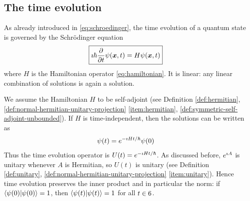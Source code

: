 \begin{digression}
\end{digression}


\subsection{The time evolution}\label{sec:time-evolution}

As already introduced in \eqref{eq:schroedinger}, the time evolution of a quantum state is governed by the Schrödinger equation
\[
\boxed{
\imath \hbar  \frac{\partial}{\partial t}\psi({\boldsymbol{x}}, t) = H  \psi({\boldsymbol{x}}, t)
}
\]
where $H$ is the Hamiltonian operator \eqref{eq:hamiltonian}.
It is linear: any linear combination of solutions is again a solution.

We assume the Hamiltonian $H$ to be self-adjoint (see Definition \ref{def:hermitian}, \ref{def:normal-hermitian-unitary-projection} \ref{item:hermitian}, \ref{def:symmetric-self-adjoint-unbounded}).
If $H$ is time-independent, then the solutions can be written as
\[
\psi(t) = e^{- \imath H t / \hbar} \psi(0)
\]
Thus the time evolution operator is
\(
U(t) = e^{- \imath H t / \hbar}
\).
As discussed before, $e^{\imath A}$ is unitary whenever $A$ is Hermitian, so $U(t)$ is unitary (see Definition \ref{def:unitary}, \ref{def:normal-hermitian-unitary-projection} \ref{item:unitary}).
Hence time evolution preserves the inner product and in particular the norm:
if \(\braket{\psi(0) | \psi(0)} = 1\), then
\(
\braket{\psi(t) | \psi(t)} = 1
\)
for all $t \in 6$.







